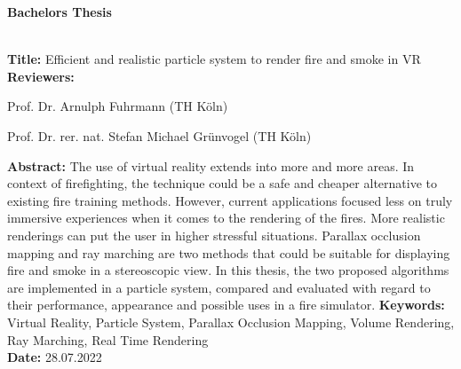 \begin{flushleft}
	\begin{huge}
		\textbf{Bachelors Thesis}
	\end{huge}
	~\\
	\textbf{Title:} Efficient and realistic particle system to render fire and smoke in VR
	~\\
	\doublespacing
	\textbf{Reviewers:}
	\begin{description}
		\vspace{-0.2cm}
		\itemsep-8pt
		\item[–]
			Prof. Dr. Arnulph Fuhrmann (TH Köln)
		\item[–]
			Prof. Dr. rer. nat. Stefan Michael Grünvogel (TH Köln)
	\end{description}
	\vspace{-0.4cm}
	\singlespacing
	\textbf{Abstract:}
	The use of virtual reality extends into more and more areas.
	In context of firefighting, the technique could be a safe and cheaper
	alternative to existing fire training methods.
	However, current applications focused less on truly immersive experiences when it
	comes to the rendering of the fires. More realistic renderings can put the user in higher
	stressful situations.
	Parallax occlusion mapping and ray marching are two methods that could be suitable
	for displaying fire and smoke in a stereoscopic view.
	In this thesis, the two proposed algorithms are implemented in a particle system, compared and
	evaluated with regard to their performance, appearance and possible uses in a fire simulator.
	\singlespacing
	\textbf{Keywords:} Virtual Reality, Particle System, Parallax Occlusion Mapping, Volume Rendering, Ray Marching, Real Time Rendering\\
	\doublespacing
	\textbf{Date:} 28.07.2022
\end{flushleft}
